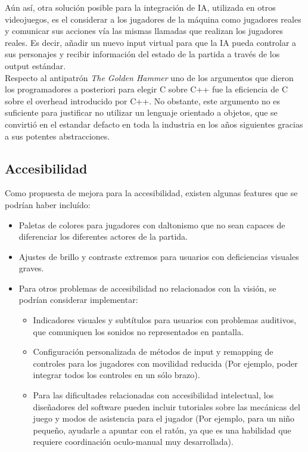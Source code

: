 \documentclass[a4paper,12pt]{report}
\begin{document}
    Aún así, otra solución posible para la integración de IA, utilizada en otros videojuegos, es el considerar a los jugadores de la máquina como jugadores reales y comunicar sus acciones vía las mismas llamadas que realizan los jugadores reales. Es decir, añadir un nuevo input virtual para que la IA pueda controlar a sus personajes y recibir información del estado de la partida a través de los output estándar.\\
    
    Respecto al antipatrón \textit{The Golden Hammer} uno de los argumentos que dieron los programadores a posteriori para elegir C sobre C++ fue la eficiencia de C sobre el overhead introducido por C++. No obstante, este argumento no es suficiente para justificar no utilizar un lenguaje orientado a objetos, que se convirtió en el estandar defacto en toda la industria en los años siguientes gracias a sus potentes abstracciones.\\
    
    
    \subsection{Accesibilidad}
    Como propuesta de mejora para la accesibilidad, existen algunas features que se podrían haber incluído:
    \begin{itemize}
    	\item Paletas de colores para jugadores con daltonismo que no sean capaces de diferenciar los diferentes actores de la partida.
    	\item Ajustes de brillo y contraste extremos para usuarios con deficiencias visuales graves.
    	\item  Para otros problemas de accesibilidad no relacionados con la visión, se podrían considerar implementar:
    	\begin{itemize}
    		\item Indicadores visuales y subtítulos para usuarios con problemas auditivos, que comuniquen los sonidos no representados en pantalla.
    		\item Configuración personalizada de métodos de input y remapping de controles para los jugadores con movilidad reducida (Por ejemplo, poder integrar todos los controles en un sólo brazo).
    		\item 	Para las dificultades relacionadas con accesibilidad intelectual, los diseñadores del software pueden incluir tutoriales sobre las mecánicas del juego y modos de asistencia para el jugador (Por ejemplo, para un niño pequeño, ayudarle a apuntar con el ratón, ya que es una habilidad que requiere coordinación oculo-manual muy desarrollada).
    	\end{itemize}
    \end{itemize}
\end{document}
